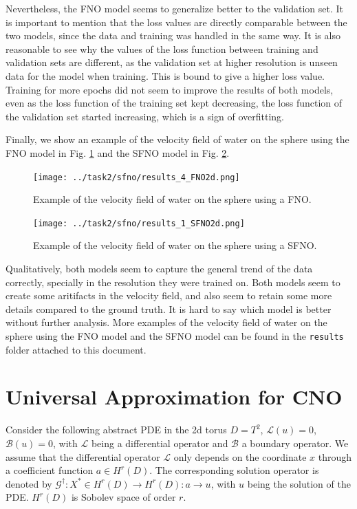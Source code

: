 \documentclass[unicode,11pt,a4paper,oneside,numbers=endperiod,openany]{scrartcl}
\begin{document}
Nevertheless, the FNO model seems to generalize better to the validation set.
It is important to mention that the loss values are directly comparable
between the two models, since the data and training was handled in the same way.
It is also reasonable to see why the values of the loss function between
training and validation sets are different, as the validation set at higher
resolution is unseen data for the model when training.
This is bound to give a higher loss value. Training for more epochs did not seem
to improve the results of both models, even as the loss function of the training
set kept decreasing, the loss function of the validation set started increasing,
which is a sign of overfitting.

Finally, we show an example of the velocity field of water on the sphere using
the FNO model in Fig. \ref{fig:example_fno2d} and the SFNO model in Fig.
\ref{fig:example_sfno2d}.
\begin{figure}[ht!]
    \centering
    \texttt{[image: ../task2/sfno/results\_4\_FNO2d.png]}
    \caption{Example of the velocity field of water on the sphere using a FNO.}
    \label{fig:example_fno2d}
\end{figure}
\begin{figure}[ht!]
    \centering
    \texttt{[image: ../task2/sfno/results\_1\_SFNO2d.png]}
    \caption{Example of the velocity field of water on the sphere using a SFNO.}
    \label{fig:example_sfno2d}
\end{figure}
Qualitatively, both models seem to capture the general trend of the data
correctly, specially in the resolution they were trained on. Both models seem to
create some aritifacts in the velocity field, and also seem to retain some more
details compared to the ground truth. It is hard to say which model is better
without further analysis.
More examples of the velocity field of water on the sphere using the FNO model
and the SFNO model can be found in the \texttt{results} folder attached to this document.

\section{Universal Approximation for CNO}\label{sec:task3}
Consider the following abstract PDE in the 2d torus $D = T^2$,
$\mathcal{L}(u) = 0$, $\mathcal{B}(u) = 0$,
with $\mathcal{L}$ being a differential operator and $\mathcal{B}$ a boundary operator. We assume that the differential
operator $\mathcal{L}$ only depends on the coordinate $x$ through a coefficient function
$a \in H^r(D)$. The corresponding solution operator is denoted by 
$\mathcal{G}^{\dagger} : X^* \in H^r(D) \to H^r(D) : a \to u$, with $u$ being the
solution of the PDE. $H^r(D)$ is Sobolev space of order $r$.
\end{document}
